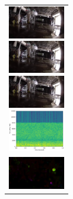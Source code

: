 \begin{figure}[htbp]
\begin{tabular}{l}
\begin{minipage}{0.165\hsize}
\begin{center}
        \end{center}
      \end{minipage}
      \begin{minipage}{0.165\hsize}
        \begin{center}
          \includegraphics[clip, width=2.5cm]{./Figures/still_stop2-3.eps}
        \end{center}
      \end{minipage}
      \begin{minipage}{0.165\hsize}
        \begin{center}
          \includegraphics[clip, width=2.5cm]{./Figures/still_stop2-4.eps}
        \end{center}
      \end{minipage}
      \begin{minipage}{0.165\hsize}
        \begin{center}
          \includegraphics[clip, width=2.5cm]{./Figures/still_stop2-5.eps}
        \end{center}
      \end{minipage}
      \begin{minipage}{0.165\hsize}
        \begin{center}
          \includegraphics[clip, width=2.5cm]{./Figures/sound_stop2.eps}
        \end{center}
      \end{minipage}
\\  %
      \begin{minipage}{0.165\hsize}
        \begin{center}
          \includegraphics[clip, width=2.5cm]{./Figures/optic_stop2-1.eps}

\end{center}
\end{minipage}
\end{tabular}
\end{figure}
